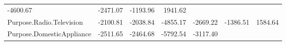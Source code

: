 \documentclass[]{article}
\begin{document}
\begin{longtable}[]{@{}lrrrrrr@{}}
\begin{minipage}[t]{0.08\columnwidth}
-4600.67\strut
\end{minipage} & \begin{minipage}[t]{0.08\columnwidth}\raggedleft\strut
-2471.07\strut
\end{minipage} & \begin{minipage}[t]{0.08\columnwidth}\raggedleft\strut
-1193.96\strut
\end{minipage} & \begin{minipage}[t]{0.08\columnwidth}\raggedleft\strut
1941.62\strut
\end{minipage}\tabularnewline
\begin{minipage}[t]{0.31\columnwidth}\raggedright\strut
Purpose.Radio.Television\strut
\end{minipage} & \begin{minipage}[t]{0.10\columnwidth}\raggedleft\strut
-2100.81\strut
\end{minipage} & \begin{minipage}[t]{0.08\columnwidth}\raggedleft\strut
-2038.84\strut
\end{minipage} & \begin{minipage}[t]{0.08\columnwidth}\raggedleft\strut
-4855.17\strut
\end{minipage} & \begin{minipage}[t]{0.08\columnwidth}\raggedleft\strut
-2669.22\strut
\end{minipage} & \begin{minipage}[t]{0.08\columnwidth}\raggedleft\strut
-1386.51\strut
\end{minipage} & \begin{minipage}[t]{0.08\columnwidth}\raggedleft\strut
1584.64\strut
\end{minipage}\tabularnewline
\begin{minipage}[t]{0.31\columnwidth}\raggedright\strut
Purpose.DomesticAppliance\strut
\end{minipage} & \begin{minipage}[t]{0.10\columnwidth}\raggedleft\strut
-2511.65\strut
\end{minipage} & \begin{minipage}[t]{0.08\columnwidth}\raggedleft\strut
-2464.68\strut
\end{minipage} & \begin{minipage}[t]{0.08\columnwidth}\raggedleft\strut
-5792.54\strut
\end{minipage} & \begin{minipage}[t]{0.08\columnwidth}\raggedleft\strut
-3117.40\strut
\end{minipage} & \begin{minipage}[t]{0.08\columnwidth}\raggedleft\strut

\end{minipage}
\end{longtable}
\end{document}
